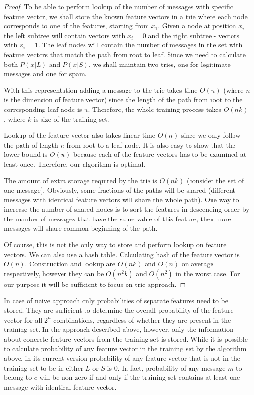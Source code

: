 \documentclass[12pt]{report}
\makeatletter
\renewcommand{\subsection}{\@startsection{subsection}{2}{0mm}{-\baselineskip}{-5pt}{\bf}}
\makeatother
\begin{document}
\begin{proof}
	To be able to perform lookup of the number of messages with specific feature vector, we shall store the known feature vectors in a trie where each node corresponds to one of the features, starting from $x_1$. Given a node at position $x_i$ the left subtree will contain vectors with $x_i = 0$ and the right subtree - vectors with $x_i = 1$. The leaf nodes will contain the number of messages in the set with feature vectors that match the path from root to leaf. Since we need to calculate both $P(x | L)$ and $P(x | S)$, we shall maintain two tries, one for legitimate messages and one for spam.
	
	With this representation adding a message to the trie takes time $O(n)$ (where $n$ is the dimension of feature vector) since the length of the path from root to the corresponding leaf node is $n$. Therefore, the whole training process takes $O(nk)$, where $k$ is size of the training set.
	
	Lookup of the feature vector also takes linear time $O(n)$ since we only follow the path of length $n$ from root to a leaf node. It is also easy to show that the lower bound is $O(n)$ because each of the feature vectors has to be examined at least once. Therefore, our algorithm is optimal.
	
	The amount of extra storage required by the trie is $O(nk)$ (consider the set of one message). Obviously, some fractions of the paths will be shared (different messages with identical feature vectors will share the whole path). One way to increase the number of shared nodes is to sort the features in descending order by the number of messages that have the same value of this feature, then more messages will share common beginning of the path.
	
	Of course, this is not the only way to store and perform lookup on feature vectors. We can also use a hash table. Calculating hash of the feature vector is $O(n)$. Construction and lookup are $O(nk)$ and $O(n)$ on average respectively, however they can be $O(n^2k)$ and $O(n^2)$ in the worst case. For our purpose it will be sufficient to focus on trie approach.
\end{proof}

\subsection{Generalizing Probability of Feature Vectors}

In case of naive approach only probabilities of separate features need to be stored. They are sufficient to determine the overall probability of the feature vector for all $2^n$ combinations, regardless of whether they are present in the training set. In the approach described above, however, only the information about concrete feature vectors from the training set is stored. While it is possible to calculate probability of any feature vector in the training set by the algorithm above, in its current version probability of any feature vector that is not in the training set to be in either $L$ or $S$ is $0$. In fact, probability of any message $m$ to belong to $c$ will be non-zero if and only if the training set contains at least one message with identical feature vector.
\end{document}
